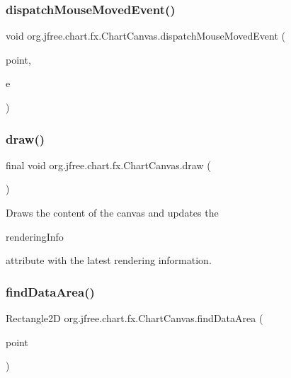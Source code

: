 \subsubsection{\texorpdfstring{dispatch\+Mouse\+Moved\+Event()}{dispatchMouseMovedEvent()}}
{\footnotesize\ttfamily void org.\+jfree.\+chart.\+fx.\+Chart\+Canvas.\+dispatch\+Mouse\+Moved\+Event (\begin{DoxyParamCaption}\item[{Point2D}]{point,  }\item[{Mouse\+Event}]{e }\end{DoxyParamCaption})}

\mbox{\label{classorg_1_1jfree_1_1chart_1_1fx_1_1_chart_canvas_a18e67b7ea52a3eb380f4e3df3e05c85d}} 
\subsubsection{\texorpdfstring{draw()}{draw()}}
{\footnotesize\ttfamily final void org.\+jfree.\+chart.\+fx.\+Chart\+Canvas.\+draw (\begin{DoxyParamCaption}{ }\end{DoxyParamCaption})}

Draws the content of the canvas and updates the 
\begin{DoxyCode}
renderingInfo 
\end{DoxyCode}
 attribute with the latest rendering information. \mbox{\label{classorg_1_1jfree_1_1chart_1_1fx_1_1_chart_canvas_a95d339b9fbbe98884de917e3194ba9bb}} 
\subsubsection{\texorpdfstring{find\+Data\+Area()}{findDataArea()}}
{\footnotesize\ttfamily Rectangle2D org.\+jfree.\+chart.\+fx.\+Chart\+Canvas.\+find\+Data\+Area (\begin{DoxyParamCaption}\item[{Point2D}]{point }\end{DoxyParamCaption})}

